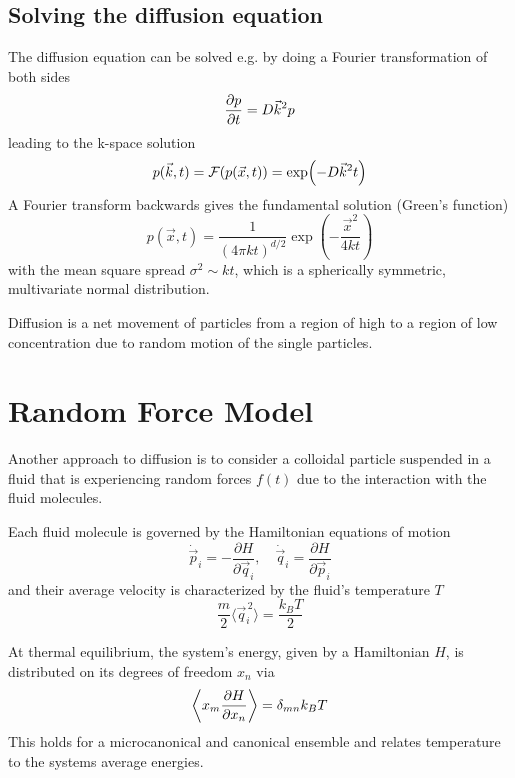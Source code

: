 \documentclass{notebook}
\begin{document}
\subsection*{Solving the diffusion equation}

The diffusion equation can be solved e.g. by doing a Fourier transformation of both sides
%
\begin{equation}
\pdv{p}{t} =  D \vec{k}^2 p
\end{equation}
%
leading to the k-space solution
%
\begin{equation}
p(\vec{k},t) = \mathcal{F}(p(\vec{x},t)) = \exp(-D \vec{k}^2 t)
\end{equation}
%
A Fourier transform backwards gives the fundamental solution (Green's function)
%
\begin{equation}
p(\vec{x},t) = \frac{1}{(4 \pi k t)^{d/2}} \exp(-\frac{\vec{x}^2}{4 k t})
\end{equation}
%
with the mean square spread $\sigma^2 \sim k t$, which is a spherically symmetric, multivariate normal distribution.

%
\begin{theorem}
	Diffusion is a net movement of particles from a region of high to a region of low concentration due to random motion of the single particles. 
\end{theorem}
%

\section{Random Force Model}

Another approach to diffusion is to consider a colloidal particle suspended in a fluid that is experiencing random forces $f(t)$ due to the interaction with the fluid molecules. 

Each fluid molecule is governed by the Hamiltonian equations of motion
%
\begin{equation}
	\dot{\vec{p}}_i = -\frac{\partial H}{\partial \vec{q}_i}, \quad 
	\dot{\vec{q}}_i = \frac{\partial H}{\partial \vec{p}_i}
\end{equation}
%
and their average velocity is characterized by the fluid's temperature $T$
%
\begin{equation}
	\frac{m}{2} \langle \vec{q}_i^{\,2} \rangle = \frac{k_B T}{2}
\end{equation}
%

\begin{remark}
	At thermal equilibrium, the system's energy, given by a Hamiltonian $H$, is distributed on its degrees of freedom $x_n$ via
	\begin{equation}
		\expval{x_m \pdv{H}{x_n}} = \delta_{mn} k_B T
	\end{equation}
	This holds for a microcanonical and canonical ensemble and relates temperature to the systems average energies.
\end{remark}
\end{document}
